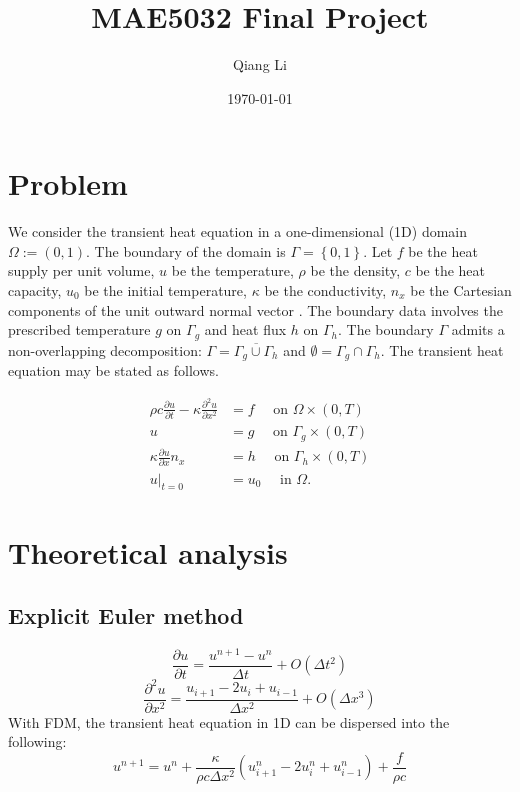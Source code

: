 \documentclass[12pt]{article}
\begin{document}
\title{\bf MAE5032 Final Project}
\author{Qiang Li}
\date{\today}
\maketitle

\section*{Problem}
We consider the transient heat equation in a one-dimensional (1D) domain $\Omega := (0,1)$. The boundary of the domain is $\Gamma = \left\lbrace 0, 1 \right\rbrace$.
Let $f$ be the heat supply per unit volume, $u$ be the temperature,  $\rho$ be the density, $c$ be the heat capacity, $u_0$ be the initial temperature, $\kappa$ be the conductivity, $n_x$ be the Cartesian components of the unit outward normal vector . The boundary data involves the prescribed temperature $g$ on $\Gamma_g$ and heat flux $h$ on $\Gamma_h$. The boundary $\Gamma$ admits a non-overlapping decomposition: $\Gamma = \overline{\Gamma_{g} \cup \Gamma_h}$ and $\emptyset = \Gamma_g \cap \Gamma_h$. The transient heat equation may be stated as follows.

\begin{align*}
\rho c \frac{\partial u}{\partial t} - \kappa  \frac{\partial^2 u}{\partial x^2} &= f \quad \mbox{ on } \Omega \times (0,T) \\
u &= g \quad \mbox{ on } \Gamma_{g} \times (0,T) \\
\kappa \frac{\partial u}{\partial x} n_{x}  &= h \quad \mbox{ on } \Gamma_h \times (0,T) \\
u|_{t=0} &= u_0 \quad \mbox{ in } \Omega.
\end{align*}

\section*{Theoretical analysis}
\subsection*{Explicit Euler method}
\begin{equation}
    \frac{\partial u}{\partial t}=\frac{u^{n+1}-u^n}{\Delta t}+O(\Delta t^2)\label{time}
\end{equation}
\begin{equation}
    \frac{\partial^2 u}{\partial x^2}=\frac{u_{i+1}-2u_i+u_{i-1}}{\Delta x^2}+O(\Delta x^3)\label{u}
\end{equation}
With FDM, the transient heat equation in 1D can be dispersed into the following:
\begin{equation}
    u^{n+1}=u^n+\frac{\kappa}{\rho c\Delta x^2}(u_{i+1}^n-2u_i^n+u_{i-1}^n)+\frac{f}{\rho c}
\end{equation}
\end{document}
